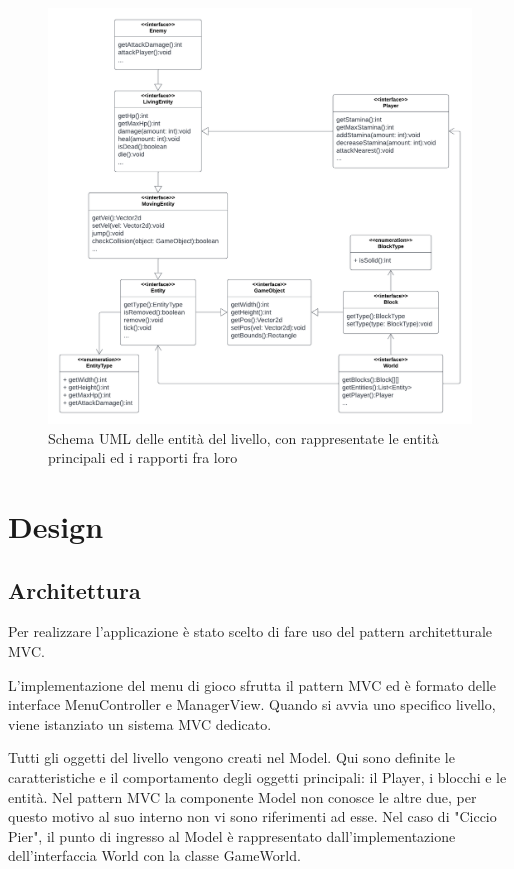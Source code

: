 \documentclass[a4paper,12pt]{report}
\begin{document}
\begin{figure}[H]
\centering{}
\includegraphics[scale=0.6] {img/analisi-uml.png}
\caption{Schema UML delle entità del livello, con rappresentate le entità principali ed i rapporti fra loro}
\label{img:analisi-uml}
\end{figure}

\chapter{Design}

\section{Architettura}

Per realizzare l'applicazione è stato scelto di fare uso del pattern architetturale MVC.

L'implementazione del menu di gioco sfrutta il pattern MVC ed è formato delle interface MenuController e ManagerView. Quando si avvia uno specifico livello, viene istanziato un sistema MVC dedicato.

Tutti gli oggetti del livello vengono creati nel Model. Qui sono definite le caratteristiche e il comportamento degli oggetti principali: il Player, i blocchi e le entità. Nel pattern MVC la componente Model non conosce le altre due, per questo motivo al suo interno non vi sono riferimenti ad esse. Nel caso di "Ciccio Pier", il punto di ingresso al Model è rappresentato dall'implementazione dell'interfaccia World con la classe GameWorld.
\end{document}
